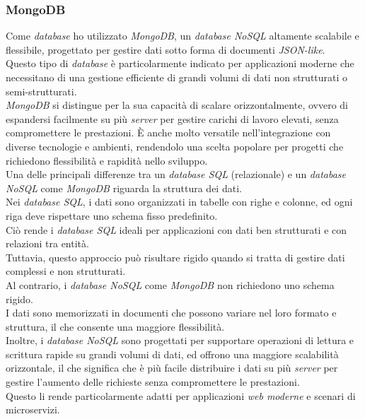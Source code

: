 \subsubsection{MongoDB}

Come \textit{database} ho utilizzato \textit{MongoDB}, un \textit{database NoSQL} altamente scalabile e flessibile, progettato per gestire dati sotto forma di documenti \textit{JSON-like}.\\
Questo tipo di \textit{database} è particolarmente indicato per applicazioni moderne che necessitano di una gestione efficiente di grandi volumi di dati non strutturati o semi-strutturati.\\
\textit{MongoDB} si distingue per la sua capacità di scalare orizzontalmente, ovvero di espandersi facilmente su più \textit{server}  per gestire carichi di lavoro elevati, senza compromettere le prestazioni. 
È anche molto versatile nell'integrazione con diverse tecnologie e ambienti, rendendolo una scelta popolare per progetti che richiedono flessibilità e rapidità nello sviluppo.\\

\noindent Una delle principali differenze tra un \textit{database SQL} (relazionale) e un \textit{database NoSQL} come \textit{MongoDB} riguarda la struttura dei dati.\\
Nei \textit{database SQL}, i dati sono organizzati in tabelle con righe e colonne, ed ogni riga deve rispettare uno schema fisso predefinito.\\
Ciò rende i \textit{database SQL} ideali per applicazioni con dati ben strutturati e con relazioni tra entità. \\
Tuttavia, questo approccio può risultare rigido quando si tratta di gestire dati complessi e non strutturati.\\

\noindent Al contrario, i \textit{database NoSQL} come \textit{MongoDB} non richiedono uno schema rigido. \\
I dati sono memorizzati in documenti che possono variare nel loro formato e struttura, il che consente una maggiore flessibilità.\\
Inoltre, i \textit{database NoSQL} sono progettati per supportare operazioni di lettura e scrittura rapide su grandi volumi di dati, ed offrono una maggiore scalabilità orizzontale,
il che significa che è più facile distribuire i dati su più \textit{server} per gestire l'aumento delle richieste senza compromettere le prestazioni.\\
Questo li rende particolarmente adatti per applicazioni \textit{web moderne} e scenari di microservizi.\\

